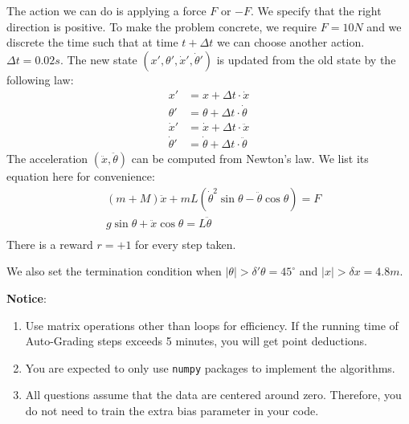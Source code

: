 \documentclass[a4paper, 12pt]{exam}
\begin{document}
\begin{questions}
The action we can do is applying a force
$F$ or $-F$. We specify that the right direction is positive. To make the problem concrete,
we require $F=10N$ and we discrete the time such that at time $t+\Delta t$ we can choose another action.
$\Delta t = 0.02s$. The new state $(x', \theta', \dot{x}', \dot{\theta}')$ is updated from the old state by the following law:
\begin{align*}
x' &= x + \Delta t \cdot \dot{x} \\
\theta' &= \theta + \Delta t \cdot \dot{\theta} \\
\dot{x}' &= \dot{x} + \Delta t \cdot \ddot{x} \\
\dot{\theta}' &= \dot{\theta} + \Delta t \cdot \ddot{\theta}
\end{align*}
The acceleration $(\ddot{x}, \ddot{\theta})$ can be computed from Newton's law.
We list its equation here for convenience:
\begin{align*}
& (m + M)\ddot{x} + mL(\dot{\theta}^2 \sin \theta - \ddot{\theta} \cos \theta) = F \\
& g \sin \theta  + \ddot{x} \cos\theta = L \ddot{\theta}\\
\end{align*}
There is a reward $r=+1$ for every step taken.

We also set the termination condition when $|\theta| > \delta' \theta = 45^\circ$ and $|x| > \delta x = 4.8 m $.

		
	\end{questions}
	
	
	\nocite{*}
	\begin{flushleft}
		\textbf{Notice}: \\
		\begin{enumerate}
			\item Use matrix operations other than loops for efficiency. If the running time of Auto-Grading steps exceeds 5 minutes, you will get point deductions.
			\item You are expected to only use \texttt{numpy} packages to implement the algorithms.
			\item All questions assume that the data are centered around zero. Therefore, you do not need to train the extra bias parameter in your code.
		\end{enumerate}
	\end{flushleft}
	
\end{document}
